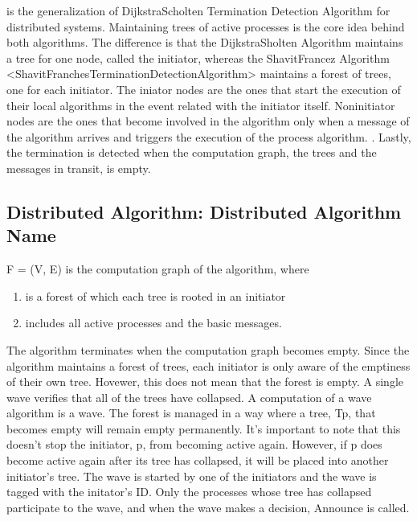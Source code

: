 \documentclass[letterpaper,10pt,english]{sphinxmanual}
\begin{document}
\sphinxAtStartPar
{\hyperref[\detokenize{docs/ShavitFranchezAlg/algorithm:shavitfranchesterminationdetectionalgorithm}]{}}  is the generalization of Dijkstra\sphinxhyphen{}Scholten  Termination Detection Algorithm for distributed systems. Maintaining trees of active processes is the core idea behind both algorithms. The difference is that the Dijkstra\sphinxhyphen{}Sholten Algorithm maintains a tree for one node, called the initiator, whereas the Shavit\sphinxhyphen{}Francez Algorithm \textless{}ShavitFranchesTerminationDetectionAlgorithm\textgreater{} maintains a forest of trees, one for each initiator. The iniator nodes are the ones that start the execution of their local algorithms in the event related with the initiator itself. Non\sphinxhyphen{}initiator nodes are the ones that become involved in the algorithm only when a message of the algorithm arrives and triggers the execution of the process algorithm. . Lastly, the termination is detected when the computation graph, the trees and the messages in transit, is empty.


\subsection{Distributed Algorithm: Distributed Algorithm Name}
\label{\detokenize{docs/ShavitFranchezAlg/algorithm:distributed-algorithm-shavitfranchezalg}}
\sphinxAtStartPar
F = (V, E) is the computation graph of the algorithm, where
\begin{enumerate}
%
\item {} 
\sphinxAtStartPar
{} is a forest of which each tree is rooted in an initiator

\item {} 
\sphinxAtStartPar
{} includes all active processes and the basic messages.

\end{enumerate}

\sphinxAtStartPar
The algorithm terminates when the computation graph becomes empty. Since the algorithm maintains a forest of trees, each initiator is only aware of the emptiness of their own tree. Hovewer, this does not mean that the forest is empty. A single wave verifies that all of the trees have collapsed. A computation of a wave algorithm is a wave. The forest is  managed in a way where a tree, Tp, that becomes empty will remain empty permanently. It’s important to note that this doesn’t stop the initiator, p, from becoming active again. However, if p does become active again after its tree has collapsed, it will be placed into another initiator’s tree. The wave is started by one of the initiators and the wave is tagged with the initator’s ID. Only the processes whose tree has collapsed participate to the wave, and when the wave makes a decision, Announce is called.
\end{document}
